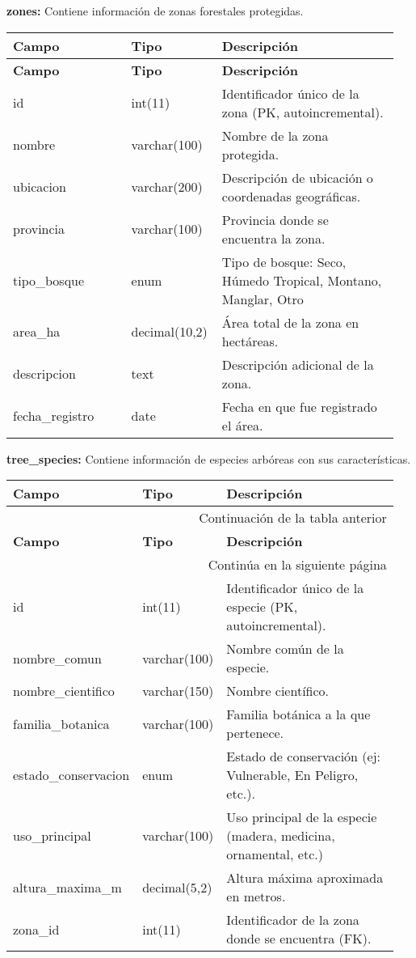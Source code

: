 \textbf{zones:} Contiene información de zonas forestales protegidas.
\begin{longtable}{|p{0.3\linewidth}|p{0.2\linewidth}|p{0.45\linewidth}|}
\hline \textbf{Campo} & \textbf{Tipo} & \textbf{Descripción} \\ \hline
\endfirsthead
\hline \textbf{Campo} & \textbf{Tipo} & \textbf{Descripción} \\ \hline
\endhead
\hline
\endfoot
\hline
\endlastfoot
id & int(11) & Identificador único de la zona (PK, autoincremental). \\ \hline
nombre & varchar(100) & Nombre de la zona protegida. \\ \hline
ubicacion & varchar(200) & Descripción de ubicación o coordenadas geográficas. \\ \hline
provincia & varchar(100) & Provincia donde se encuentra la zona. \\ \hline
tipo\_bosque & enum & Tipo de bosque: Seco, Húmedo Tropical, Montano, Manglar, Otro \\ \hline
area\_ha & decimal(10,2) & Área total de la zona en hectáreas. \\ \hline
descripcion & text & Descripción adicional de la zona. \\ \hline
fecha\_registro & date & Fecha en que fue registrado el área. \\ \hline
\end{longtable}

\textbf{tree\_species:} Contiene información de especies arbóreas con sus características.
\begin{longtable}{|p{0.3\linewidth}|p{0.2\linewidth}|p{0.45\linewidth}|}
\hline \textbf{Campo} & \textbf{Tipo} & \textbf{Descripción} \\ \hline 
\endfirsthead
\hline \multicolumn{3}{|r|}{{Continuación de la tabla anterior}} \\
\hline \textbf{Campo} & \textbf{Tipo} & \textbf{Descripción} \\ \hline 
\endhead
\hline \multicolumn{3}{|r|}{{Continúa en la siguiente página}} \\ 
\endfoot
\hline 
\endlastfoot
id & int(11) & Identificador único de la especie (PK, autoincremental). \\ \hline
nombre\_comun & varchar(100) & Nombre común de la especie. \\ \hline
nombre\_cientifico & varchar(150) & Nombre científico. \\ \hline
familia\_botanica & varchar(100) & Familia botánica a la que pertenece. \\ \hline
estado\_conservacion & enum & Estado de conservación (ej: Vulnerable, En Peligro, etc.). \\ \hline
uso\_principal & varchar(100) & Uso principal de la especie (madera, medicina, ornamental, etc.) \\ \hline
altura\_maxima\_m & decimal(5,2) & Altura máxima aproximada en metros. \\ \hline
zona\_id & int(11) & Identificador de la zona donde se encuentra (FK). \\ \hline
\end{longtable}

